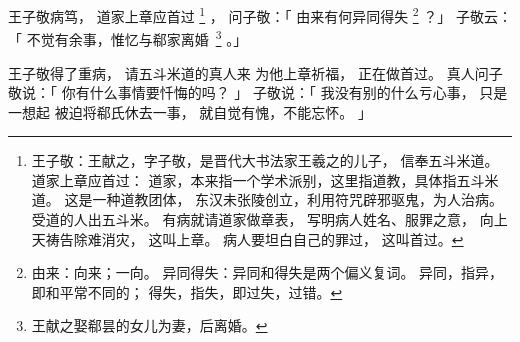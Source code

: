 
\switchcolumn*[\section{}]

王子敬病笃，
道家上章应首过%
\footnote{%
    王子敬：王献之，字子敬，是晋代大书法家王羲之的儿子，
            信奉五斗米道。
    道家上章应首过：
            道家，本来指一个学术派别，这里指道教，具体指五斗米道。
            这是一种道教团体，
            东汉未张陵创立，利用符咒辟邪驱鬼，为人治病。
            受道的人出五斗米。
            有病就请道家做章表，
            写明病人姓名、服罪之意，
            向上天祷告除难消灾，
            这叫上章。
            病人要坦白自己的罪过，
            这叫首过。
}%
，
问子敬：「
    由来有何异同得失%
    \footnote{%
        由来：向来；一向。
        异同得失：异同和得失是两个偏义复词。
                  异同，指异，即和平常不同的；
                  得失，指失，即过失，过错。
    }%
？」
子敬云：「
    不觉有余事，惟忆与郗家离\mbox{婚%
    \footnote{%
        王献之娶郗昙的女儿为妻，后离婚。       
    }}%
。」

\switchcolumn

王子敬得了重病，
请五斗米道的真人来
为他上章祈福，
正在做首过。
真人问子敬说：「
    你有什么事情要忏悔的吗？
」
子敬说：「
  我没有别的什么亏心事，
  只是一想起
  被迫将郗氏休去一事，
  就自觉有愧，不能忘怀。
」


